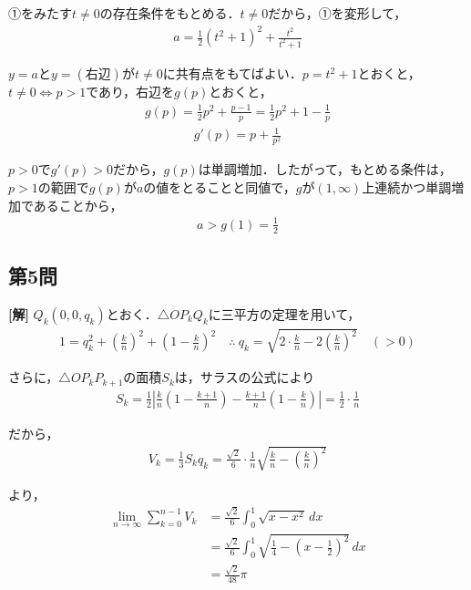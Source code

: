 \documentclass[../main.tex]{subfiles}
\begin{document}
①をみたす$t\ne0$の存在条件をもとめる．$t\ne0$だから，①を変形して，
\begin{align*}
  a=\frac12(t^2+1)^2+\frac{t^2}{t^2+1}
\end{align*}

$y=a$と$y=(\text{右辺})$が$t\ne0$に共有点をもてばよい．$p=t^2+1$とおくと，$t\ne0\iff p>1$であり，右辺を$g(p)$とおくと，
\begin{align*}
  g(p)=\frac12p^2+\frac{p-1}p=\frac12p^2+1-\frac1p
\end{align*}
\begin{align*}
  g'(p)=p+\frac1{p^2}
\end{align*}

$p>0$で$g'(p)>0$だから，$g(p)$は単調増加．したがって，もとめる条件は，$p>1$の範囲で$g(p)$が$a$の値をとることと同値で，$g$が$(1,\infty)$上連続かつ単調増加であることから，
\begin{align*}
  a>g(1)=\frac12
\end{align*}

\bigskip

\subsection*{第5問}

\noindent
{\bf [解]}
$Q_k(0,0,q_k)$とおく．$\triangle OP_kQ_k$に三平方の定理を用いて，
\begin{align*}
  1=q_k^2+\left(\frac kn\right)^2+\left(1-\frac kn\right)^2\quad\therefore\ q_k=\sqrt{2\cdot\frac kn-2\left(\frac kn\right)^2}\quad(>0)
\end{align*}

さらに，$\triangle OP_kP_{k+1}$の面積$S_k$は，サラスの公式により
\begin{align*}
  S_k=\frac12\left|\frac kn\left(1-\frac{k+1}n\right)-\frac{k+1}n\left(1-\frac kn\right)\right|=\frac12\cdot\frac1n
\end{align*}

だから，
\begin{align*}
  V_k=\frac13S_kq_k=\frac{\sqrt2}6\cdot\frac1n\sqrt{\frac kn-\left(\frac kn\right)^2}
\end{align*}

より，
\begin{align*}
  \lim_{n\to\infty}\sum_{k=0}^{n-1}V_k&=\frac{\sqrt2}6\int_0^1\sqrt{x-x^2}\,dx\\
  &=\frac{\sqrt2}6\int_0^1\sqrt{\frac14-\left(x-\frac12\right)^2}\,dx\\
  &=\frac{\sqrt2}{48}\pi
\end{align*}
\end{document}
